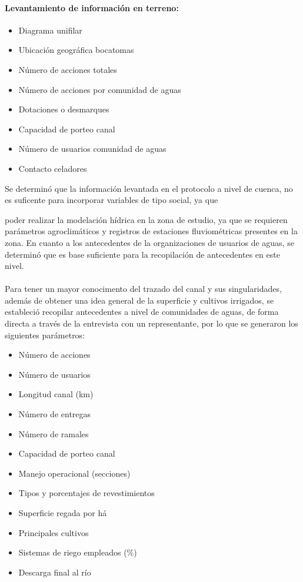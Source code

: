 \documentclass[]{article}
\begin{document}
\paragraph{Levantamiento de información en terreno:}

\begin{itemize}
\item Diagrama unifilar
\item Ubicación geográfica bocatomas
\item Número de acciones totales
\item Número de acciones por comunidad de aguas
\item Dotaciones o desmarques
\item Capacidad de porteo canal
\item Número de usuarios comunidad de aguas
\item Contacto celadores
\end{itemize}
Se determinó que la información levantada en el protocolo a nivel de cuenca, no es suficente para incorporar variables de tipo social, ya que 

poder realizar la modelación hídrica en la zona de estudio, ya que se requieren parámetros agroclimáticos y registros de estaciones fluviométricas presentes en la zona. En cuanto a los antecedentes de la organizaciones de usuarios de aguas, se determinó que es base suficiente para la recopilación de antecedentes en este nivel.\\
\\
Para tener un mayor conocimento del trazado del canal y sus singularidades, además de obtener una idea general de la superficie y cultivos irrigados, se estableció recopilar antecedentes a nivel de comunidades de aguas, de forma directa a través de la entrevista con un representante, por lo que se generaron los siguientes parámetros:

\begin{itemize}
\item Número de acciones
\item Número de usuarios
\item Longitud canal (km)
\item Número de entregas
\item Número de ramales
\item Capacidad de porteo canal
\item Manejo operacional (secciones)
\item Tipos y porcentajes de revestimientos
\item Superficie regada por há
\item Principales cultivos
\item Sistemas de riego empleados (\%)
\item Descarga final al río
\end{itemize}
\end{document}
